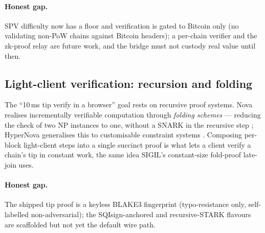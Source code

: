 \paragraph{Honest gap.} SPV difficulty now has a floor and verification is gated
to Bitcoin only (no validating non-PoW chains against Bitcoin headers); a
per-chain verifier and the zk-proof relay are future work, and the bridge must
not custody real value until then.

\subsection{Light-client verification: recursion and folding}
The ``10\,ms tip verify in a browser'' goal rests on recursive proof systems.
Nova realises incrementally verifiable computation through \emph{folding
schemes} — reducing the check of two NP instances to one, without a SNARK in the
recursive step \cite{nova2021}; HyperNova generalises this to customisable
constraint systems \cite{hypernova2023}. Composing per-block light-client steps
into a single succinct proof is what lets a client verify a chain's tip in
constant work, the same idea SIGIL's constant-size fold-proof late-join uses.

\paragraph{Honest gap.} The shipped tip proof is a keyless BLAKE3 fingerprint
(typo-resistance only, self-labelled non-adversarial); the SQIsign-anchored and
recursive-STARK flavours are scaffolded but not yet the default wire path.

